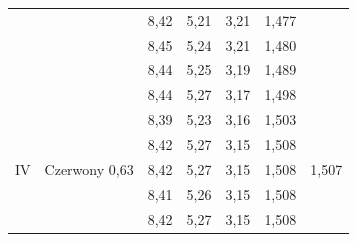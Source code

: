 \documentclass{article}
\begin{document}
\begin{adjustwidth}{-1cm}{}
\begin{center}
\begin{tabular}{|c|c|c|c|c|c|c|}
				\cline{3-6}
				& & 8,42& 5,21& 3,21& 1,477& \\
				\cline{3-6}
				& & 8,45& 5,24& 3,21& 1,480& \\
				\cline{3-6}
				& & 8,44& 5,25& 3,19& 1,489& \\
				\cline{3-6}
				& & 8,44& 5,27& 3,17& 1,498& \\
				\hline
		\multirow{5}{*}{IV} & \multirow{5}{*}{\parbox[c]{1cm}{Czerwony 0,63}} & 8,39& 5,23& 3,16& 1,503& \multirow{5}{*}{1,507}\\
		\cline{3-6}
		& & 8,42& 5,27& 3,15& 1,508& \\
		\cline{3-6}
		& & 8,42& 5,27& 3,15& 1,508& \\
		\cline{3-6}
		& & 8,41& 5,26& 3,15& 1,508& \\
		\cline{3-6}
		& & 8,42& 5,27& 3,15& 1,508& \\
		\hline

	\end{tabular}
\end{center}
\end{adjustwidth}
	
\end{document}
